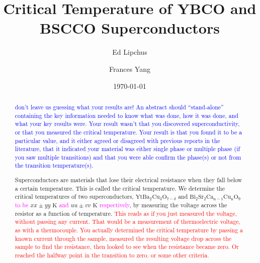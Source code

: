 \documentclass[prb,preprint]{revtex4-1}
\begin{document}

\title{Critical Temperature of YBCO and BSCCO Superconductors}

\author{Ed Lipchus}



\author{Frances Yang}


\date{\today}

\begin{abstract}

\textcolor{blue}{don't leave us guessing what your results are! An abstract should ``stand-alone'' containing the key information needed to know what was done, how it was done, and what your key results were. Your result wasn't that you discovered superconductivity, or that you measured the critical temperature. Your result is that you found it to be a particular value, and it either agreed or disagreed with previous reports in the literature, that it indicated your material was either single phase or multiple phase (if you saw multiple transitions) and that you were able confirm the phase(s) or not from the transition temperature(s).} 

Superconductors are materials that lose their electrical resistance  when they fall below a certain temperature. This is called the critical temperature. We determine the critical temperatures of two superconductors,  $\textrm{Yt}\textrm{Ba}_{2}\textrm{Cu}_{3}\textrm{O}_{7-\delta}$ and $\textrm{Bi}_{2}\textrm{Sr}_{2}\textrm{Ca}_{\textrm{n}-1}\textrm{Cu}_{\textrm{n}}\textrm{O}_{9}$ \textcolor{magenta}{to be }$xx \pm yy \textrm{ K}$ \textcolor{magenta}{and } $uu \pm vv \textrm{ K}$\textcolor{magenta}{ respectively}, by measuring the voltage across the resistor as a function of temperature. \textcolor{red}{This reads as if you just measured the voltage, without passing any current. That would be a measurement of thermoelectric voltage, as with a thermocouple. You actually determined the critical temperature by passing a known current through the sample, measured the resulting voltage drop across the sample to find the resistance, then looked to see when the resistance became zero. Or reached the halfway point in the transition to zero. or some other criteria. }



\end{abstract}
\end{document}
